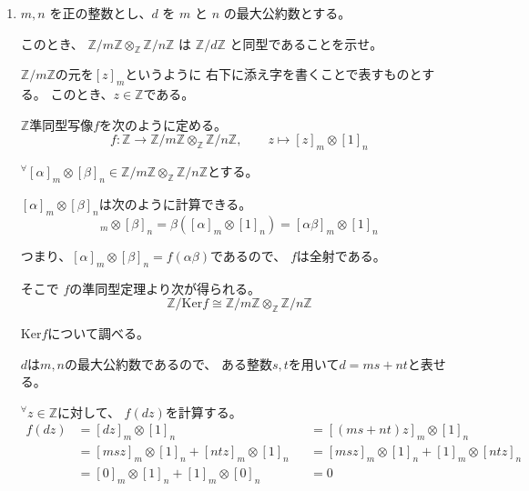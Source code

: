 \documentclass[12pt,b5paper]{ltjsarticle}
\begin{document}
\begin{enumerate}

 \item
      $m, n$ を正の整数とし、$d$ を $m$ と $n$ の最大公約数とする。

      このとき、
      $\mathbb{Z}/m\mathbb{Z}
       \otimes_{\mathbb{Z}}
       \mathbb{Z}/n\mathbb{Z}$ は
      $\mathbb{Z}/d\mathbb{Z}$ と同型であることを示せ。

      \dotfill


      $\mathbb{Z}/m\mathbb{Z}$の元を$[z]_{m}$というように
      右下に添え字を書くことで表すものとする。
      このとき、$z\in\mathbb{Z}$である。


      $\mathbb{Z}$準同型写像$f$を次のように定める。
      \begin{equation}
       f : \mathbb{Z} \to
        \mathbb{Z}/m\mathbb{Z}\otimes_{\mathbb{Z}}\mathbb{Z}/n\mathbb{Z},
        \qquad z \mapsto [z]_{m} \otimes [1]_{n}
      \end{equation}

      ${}^{\forall} [\alpha]_{m} \otimes [\beta]_{n} \in \mathbb{Z}/m\mathbb{Z}\otimes_{\mathbb{Z}}\mathbb{Z}/n\mathbb{Z}$とする。

      $[\alpha]_{m} \otimes [\beta]_{n}$は次のように計算できる。
      \begin{equation}
       [\alpha]_{m} \otimes [\beta]_{n}
        = \beta([\alpha]_{m} \otimes [1]_{n})
        = [\alpha\beta]_{m} \otimes [1]_{n}
      \end{equation}

      つまり、$[\alpha]_{m} \otimes [\beta]_{n} = f(\alpha\beta)$であるので、
      $f$は全射である。

      そこで
      $f$の準同型定理より次が得られる。
      \begin{equation}
       \mathbb{Z}/\mathrm{Ker}f \cong \mathbb{Z}/m\mathbb{Z}\otimes_{\mathbb{Z}}\mathbb{Z}/n\mathbb{Z}
        \label{fundatheo}
      \end{equation}

      $\mathrm{Ker}f$について調べる。

      $d$は$m,n$の最大公約数であるので、
      ある整数$s,t$を用いて$d=ms+nt$と表せる。

      ${}^{\forall}z\in\mathbb{Z}$に対して、
      $f(dz)$を計算する。
      \begin{align}
       f(dz) &= [dz]_{m} \otimes [1]_{n}
       &
       &= [(ms+nt)z]_{m} \otimes [1]_{n}\\
       &= [msz]_{m} \otimes [1]_{n} + [ntz]_{m}  \otimes [1]_{n}
       &
       &= [msz]_{m} \otimes [1]_{n} + [1]_{m} \otimes [ntz]_{n}\\
       &= [0]_{m} \otimes [1]_{n} + [1]_{m} \otimes [0]_{n}
       &
       &= 0
      \end{align}


\end{enumerate}
\end{document}
